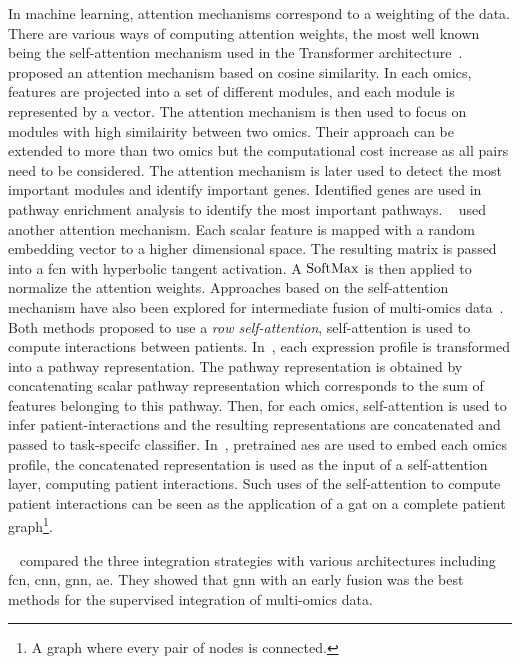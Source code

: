 \documentclass[../main.tex]{subfiles}
\begin{document}
			In machine learning, attention mechanisms correspond to a weighting of the data.
			There are various ways of computing attention weights, the most well known being the self-attention mechanism used in the Transformer architecture~\cite{AttentionAllYouNeed}.
			\citeauthor{MOMA}~\cite{MOMA} proposed an attention mechanism based on cosine similarity.
			In each omics, features are projected into a set of different modules, and each module is represented by a vector.
			The attention mechanism is then used to focus on modules with high similairity between two omics.
			Their approach can be extended to more than two omics but the computational cost increase as all pairs need to be considered.
			The attention mechanism is later used to detect the most important modules and identify important genes.
			Identified genes are used in pathway enrichment analysis to identify the most important pathways.
			\citeauthor{moBRCA}~\cite{moBRCA} used another attention mechanism.
			Each scalar feature is mapped with a random embedding vector to a higher dimensional space.
			The resulting matrix is passed into a \gls{fcn} with hyperbolic tangent activation.
			A \(\operatorname{SoftMax}\) is then applied to normalize the attention weights.
			Approaches based on the self-attention mechanism have also been explored for intermediate fusion of multi-omics data~\cite{Yao_2024,Lan2024}.
			Both methods proposed to use a \emph{row self-attention}, self-attention is used to compute interactions between patients.
			In~\cite{Lan2024}, each expression profile is transformed into a pathway representation.
			The pathway representation is obtained by concatenating scalar pathway representation which corresponds to the sum of features belonging to this pathway.
			Then, for each omics, self-attention is used to infer patient-interactions and the resulting representations are concatenated and passed to task-specifc classifier.
			In~\cite{Yao_2024}, pretrained \glspl{ae} are used to embed each omics profile, the concatenated representation is used as the input of a self-attention layer, computing patient interactions.
			Such uses of the self-attention to compute patient interactions can be seen as the application of a \gls{gat} on a complete patient graph\footnote{A graph where every pair of nodes is connected.}.

			\ifSubfilesClassLoaded{%
			}{
			}

			\citeauthor{Leng2022}~\cite{Leng2022} compared the three integration strategies with various architectures including \gls{fcn}, \gls{cnn}, \gls{gnn}, \gls{ae}.
			They showed that \gls{gnn} with an early fusion was the best methods for the supervised integration of multi-omics data.
\end{document}
